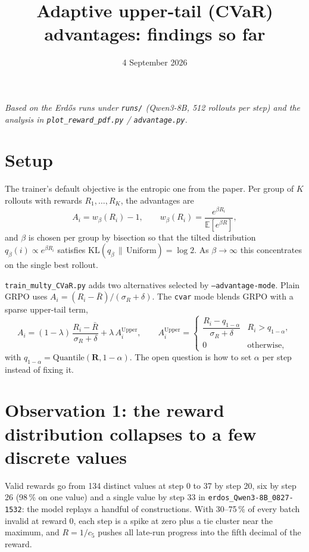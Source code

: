 \documentclass[11pt]{article}
\title{Adaptive upper-tail (CVaR) advantages: findings so far}
\author{}
\date{4 September 2026}
\begin{document}
\maketitle

\noindent\emph{Based on the Erd\H{o}s runs under \texttt{runs/} (Qwen3-8B, 512 rollouts per step) and the analysis in \texttt{plot\_reward\_pdf.py} / \texttt{advantage.py}.}

\section{Setup}

The trainer's default objective is the entropic one from the paper. Per group of $K$ rollouts with rewards $R_1,\dots,R_K$, the advantages are
\[
  A_i = w_\beta(R_i) - 1, \qquad
  w_\beta(R_i) = \frac{e^{\beta R_i}}{\mathbb{E}\!\left[e^{\beta R}\right]},
\]
and $\beta$ is chosen per group by bisection so that the tilted distribution $q_\beta(i)\propto e^{\beta R_i}$ satisfies $\mathrm{KL}(q_\beta \,\|\, \mathrm{Uniform}) = \log 2$. As $\beta \to \infty$ this concentrates on the single best rollout.

\texttt{train\_multy\_CVaR.py} adds two alternatives selected by \texttt{--advantage-mode}. Plain GRPO uses $A_i = (R_i - \bar R)/(\sigma_R + \delta)$. The \texttt{cvar} mode blends GRPO with a sparse upper-tail term,
\[
  A_i = (1-\lambda)\,\frac{R_i - \bar R}{\sigma_R + \delta} + \lambda\, A_i^{\mathrm{Upper}}, \qquad
  A_i^{\mathrm{Upper}} =
  \begin{cases}
    \dfrac{R_i - q_{1-\alpha}}{\sigma_R + \delta} & R_i > q_{1-\alpha},\\[6pt]
    0 & \text{otherwise},
  \end{cases}
\]
with $q_{1-\alpha} = \mathrm{Quantile}(\mathbf R, 1-\alpha)$. The open question is how to set $\alpha$ per step instead of fixing it.



\section{Observation 1: the reward distribution collapses to a few discrete values}

Valid rewards go from 134 distinct values at step 0 to 37 by step 20, six by step 26 (98\,\% on one value) and a single value by step 33 in \texttt{erdos\_Qwen3-8B\_0827-1532}: the model replays a handful of constructions. With 30--75\,\% of every batch invalid at reward 0, each step is a spike at zero plus a tie cluster near the maximum, and $R = 1/c_5$ pushes all late-run progress into the fifth decimal of the reward.
\end{document}
